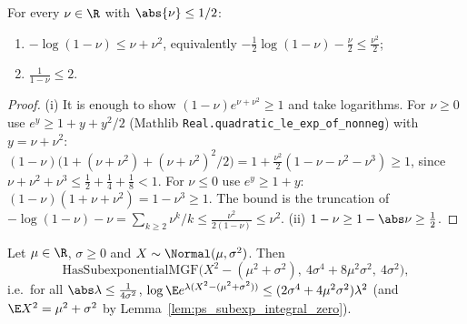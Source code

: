 \begin{lemma}\label{lem:log_ineq_nu}
\leanok
For every $\nu \in \R$ with $\abs{\nu} \le 1/2$:
\begin{enumerate}
  \item[(i)] $-\log(1-\nu) \le \nu + \nu^2$, equivalently $-\frac12\log(1-\nu) - \frac{\nu}{2} \le \frac{\nu^2}{2}$;
  \item[(ii)] $\frac{1}{1-\nu} \le 2$.
\end{enumerate}
\end{lemma}

\begin{proof}
\leanok
(i) It is enough to show $(1-\nu)e^{\nu+\nu^2} \ge 1$ and take logarithms. For $\nu \ge 0$ use
$e^y \ge 1 + y + y^2/2$ (Mathlib \texttt{Real.quadratic\_le\_exp\_of\_nonneg}) with $y = \nu+\nu^2$:
$(1-\nu)\big(1 + (\nu+\nu^2) + (\nu+\nu^2)^2/2\big) = 1 + \frac{\nu^2}{2}(1 - \nu - \nu^2 - \nu^3) \ge 1$,
since $\nu + \nu^2 + \nu^3 \le \frac12+\frac14+\frac18 < 1$. For $\nu \le 0$ use $e^y \ge 1+y$:
$(1-\nu)(1+\nu+\nu^2) = 1 - \nu^3 \ge 1$. The bound is the truncation of
$-\log(1-\nu) - \nu = \sum_{k\ge2}\nu^k/k \le \frac{\nu^2}{2(1-\nu)} \le \nu^2$.
(ii) $1 - \nu \ge 1 - \abs\nu \ge \frac12$.
\end{proof}

\begin{lemma}\label{lem:gaussian_square_subexp}
\leanok
{}
Let $\mu\in\R$, $\sigma \ge 0$ and $X \sim \Normal(\mu,\sigma^2)$. Then
\[
  \mathrm{HasSubexponentialMGF}\big(X^2 - (\mu^2 + \sigma^2),\ 4\sigma^4 + 8\mu^2\sigma^2,\ 4\sigma^2\big),
\]
i.e.\ for all $\abs\lambda \le \frac{1}{4\sigma^2}$,
$\log\E e^{\lambda(X^2 - (\mu^2+\sigma^2))} \le (2\sigma^4 + 4\mu^2\sigma^2)\lambda^2$
(and $\E X^2 = \mu^2 + \sigma^2$ by Lemma~\ref{lem:ps_subexp_integral_zero}).
\end{lemma}

